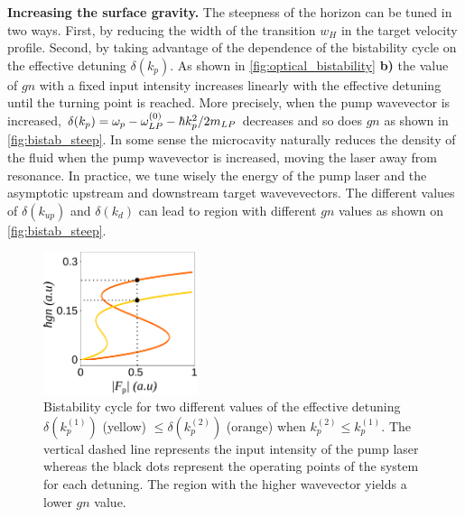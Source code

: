\bigskip

\textbf{Increasing the surface gravity.}
The steepness of the horizon can be tuned in two ways. First, by reducing the width of the transition $w_H$ in the target velocity profile.
Second, by taking advantage of the dependence of the bistability cycle on the effective detuning $\delta(k_p)$.
As shown in \autoref{fig:optical_bistability} \textbf{b)} the value of $gn$ with a fixed input intensity increases linearly with the effective detuning until the turning point is reached. More precisely,
when the pump wavevector is increased,  $\delta(k_p) = \omega_p-\omega_{LP}^{(0)}- \hbar k_p^2/2m_{LP}$ decreases and so does $gn$ as shown in \autoref{fig:bistab_steep}. In some
sense the microcavity naturally reduces the density of the fluid when the pump wavevector is increased, moving the laser away from resonance.
In practice, we tune wisely the energy of the pump laser and the asymptotic upstream and downstream target wavevevectors. The different values of $\delta(k_{up})$ and $\delta(k_{d})$ can
lead to region with different $gn$ values as shown on \autoref{fig:bistab_steep}.


\begin{figure}[h]
    \centering
    \includegraphics[width=0.4\textwidth]{chap_custom_st/fig/bistab_to_gn.pdf}
    \caption{Bistability cycle for two different values of the effective detuning $\delta(k^{(1)}_p)$ (yellow) $\leq \delta(k^{(2)}_p) $ (orange) when $k^{(2)}_p \leq k^{(1)}_p $. The vertical dashed line
    represents the input intensity of the pump laser whereas the black dots represent the operating points of the system for each detuning. The region with the higher wavevector
    yields a lower $gn$ value.}
    \label{fig:bistab_steep}
\end{figure}

